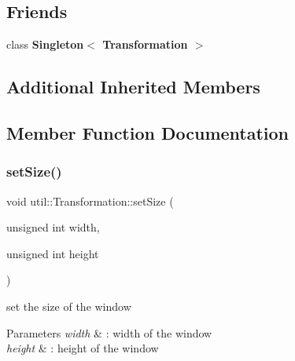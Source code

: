 \subsection*{Friends}
\begin{DoxyCompactItemize}
\item 
\mbox{\label{classutil_1_1_transformation_ad02b2174d4bc9cc7404fe0317b80c55d}} 
class {\bfseries Singleton$<$ Transformation $>$}
\end{DoxyCompactItemize}
\subsection*{Additional Inherited Members}


\subsection{Member Function Documentation}
\mbox{\label{classutil_1_1_transformation_a60ea3879083f58bb7edde16976e9fcc2}} 
\subsubsection{\texorpdfstring{set\+Size()}{setSize()}}
{\footnotesize\ttfamily void util\+::\+Transformation\+::set\+Size (\begin{DoxyParamCaption}\item[{unsigned int}]{width,  }\item[{unsigned int}]{height }\end{DoxyParamCaption})}



set the size of the window 


\begin{DoxyParams}{Parameters}
{\em width} & \+: width of the window \\
\hline
{\em height} & \+: height of the window \\
\hline
\end{DoxyParams}
\mbox{\label{classutil_1_1_transformation_ab13ab300ab42b732ea2b1d301bed122a}} 
